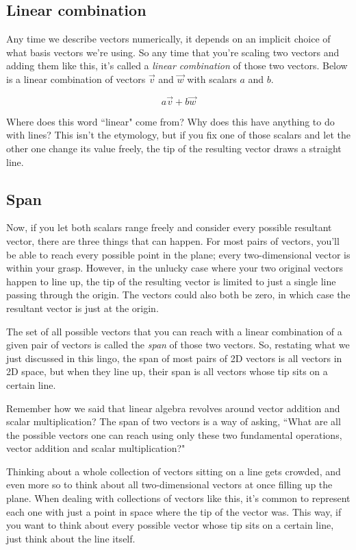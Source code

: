 \subsection{Linear combination}

Any time we describe vectors numerically, it depends on an implicit choice of
what basis vectors we're using. So any time that you're scaling two vectors and
adding them like this, it's called a \textit{linear combination} of those two
vectors. Below is a linear combination of vectors $\vec{v}$ and $\vec{w}$ with
scalars $a$ and $b$.

\begin{equation*}
  a \vec{v} + b \vec{w}
\end{equation*}

Where does this word ``linear" come from? Why does this have anything to do with
lines? This isn't the etymology, but if you fix one of those scalars and let the
other one change its value freely, the tip of the resulting vector draws a
straight line.

\subsection{Span}

Now, if you let both scalars range freely and consider every possible resultant
vector, there are three things that can happen. For most pairs of vectors,
you'll be able to reach every possible point in the plane; every two-dimensional
vector is within your grasp. However, in the unlucky case where your two original
vectors happen to line up, the tip of the resulting vector is limited to just a
single line passing through the origin. The vectors could also both be zero, in
which case the resultant vector is just at the origin.

The set of all possible vectors that you can reach with a linear combination of
a given pair of vectors is called the \textit{span} of those two vectors. So,
restating what we just discussed in this lingo, the span of most pairs of 2D
vectors is all vectors in 2D space, but when they line up, their span is all
vectors whose tip sits on a certain line.

Remember how we said that linear algebra revolves around vector addition and
scalar multiplication? The span of two vectors is a way of asking, ``What are
all the possible vectors one can reach using only these two fundamental
operations, vector addition and scalar multiplication?"

Thinking about a whole collection of vectors sitting on a line gets crowded, and
even more so to think about all two-dimensional vectors at once filling up the
plane. When dealing with collections of vectors like this, it's common to
represent each one with just a point in space where the tip of the vector was.
This way, if you want to think about every possible vector whose tip sits on a
certain line, just think about the line itself.

